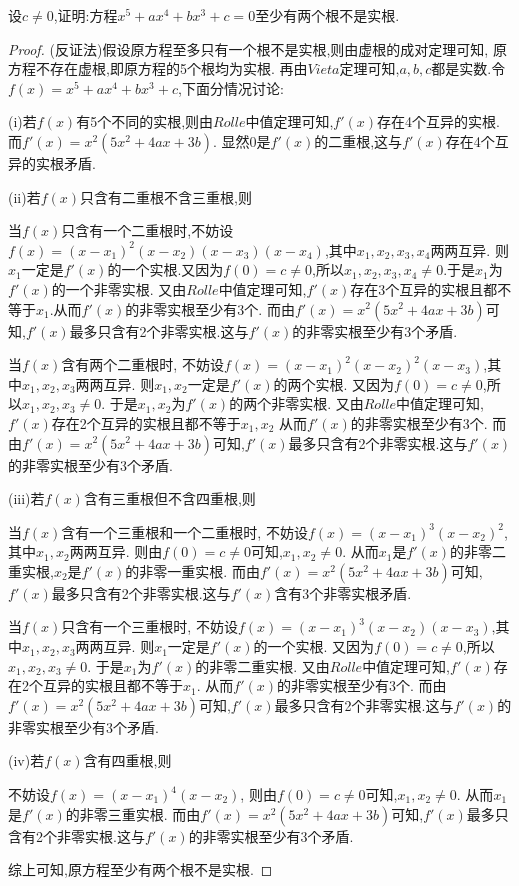 \documentclass[lang=cn,newtx,10pt,scheme=chinese]{../Template/elegantbook}
\begin{document}
\begin{exercise}
    设\(c\neq0\),证明:方程\(x^5 + ax^4 + bx^3 + c = 0\)至少有两个根不是实根.
\end{exercise}
    \begin{proof}
        (反证法)假设原方程至多只有一个根不是实根,则由虚根的成对定理可知,
        原方程不存在虚根,即原方程的5个根均为实根.
        再由$Vieta$定理可知,$a,b,c$都是实数.令$f(x)=x^5+ax^4+bx^3+c$,下面分情况讨论:

        (i)若$f(x)$有5个不同的实根,则由$Rolle$中值定理可知,$f'(x)$存在4个互异的实根.
        而$f'(x) =x^2(5x^2+4ax+3b)$.
        显然0是$f'(x)$的二重根,这与$f'(x)$存在4个互异的实根矛盾.

        (ii)若$f(x)$只含有二重根不含三重根,则

        当$f(x)$只含有一个二重根时,不妨设$f(x)=(x-x_1)^2(x-x_2)(x-x_3)(x-x_4)$,其中$x_1,x_2,x_3,x_4$两两互异.
        则$x_1$一定是$f'(x)$的一个实根.又因为$f(0)=c\ne0$,所以$x_1,x_2,x_3,x_4\ne0$.于是$x_1$为$f'(x)$的一个非零实根.
        又由$Rolle$中值定理可知,$f'(x)$存在3个互异的实根且都不等于$x_1$.从而$f'(x)$的非零实根至少有3个.
        而由$f'(x) =x^2(5x^2+4ax+3b)$可知,$f'(x)$最多只含有2个非零实根.这与$f'(x)$的非零实根至少有3个矛盾.

        当$f(x)$含有两个二重根时,
        不妨设$f(x)=(x-x_1)^2(x-x_2)^2(x-x_3)$,其中$x_1,x_2,x_3$两两互异.
        则$x_1,x_2$一定是$f'(x)$的两个实根.
        又因为$f(0)=c\ne0$,所以$x_1,x_2,x_3\ne0$.
        于是$x_1,x_2$为$f'(x)$的两个非零实根.
        又由$Rolle$中值定理可知,$f'(x)$存在2个互异的实根且都不等于$x_1,x_2$
        从而$f'(x)$的非零实根至少有3个.
        而由$f'(x) =x^2(5x^2+4ax+3b)$可知,$f'(x)$最多只含有2个非零实根.这与$f'(x)$的非零实根至少有3个矛盾.

        (iii)若$f(x)$含有三重根但不含四重根,则

        当$f(x)$含有一个三重根和一个二重根时,
        不妨设$f(x)=(x-x_1)^3(x-x_2)^2$,其中$x_1,x_2$两两互异.
        则由$f(0)=c\ne0$可知,$x_1,x_2\ne0$.
        从而$x_1$是$f'(x)$的非零二重实根,$x_2$是$f'(x)$的非零一重实根.
        而由$f'(x) =x^2(5x^2+4ax+3b)$可知,$f'(x)$最多只含有2个非零实根.这与$f'(x)$含有3个非零实根矛盾.
        
        当$f(x)$只含有一个三重根时,
        不妨设$f(x)=(x-x_1)^3(x-x_2)(x-x_3)$,其中$x_1,x_2,x_3$两两互异.
        则$x_1$一定是$f'(x)$的一个实根.
        又因为$f(0)=c\ne0$,所以$x_1,x_2,x_3\ne0$.
        于是$x_1$为$f'(x)$的非零二重实根.
        又由$Rolle$中值定理可知,$f'(x)$存在2个互异的实根且都不等于$x_1$.
        从而$f'(x)$的非零实根至少有3个.
        而由$f'(x) =x^2(5x^2+4ax+3b)$可知,$f'(x)$最多只含有2个非零实根.这与$f'(x)$的非零实根至少有3个矛盾.

        (iv)若$f(x)$含有四重根,则

        不妨设$f(x)=(x-x_1)^4(x-x_2)$,
        则由$f(0)=c\ne0$可知,$x_1,x_2\ne0$.
        从而$x_1$是$f'(x)$的非零三重实根.
        而由$f'(x) =x^2(5x^2+4ax+3b)$可知,$f'(x)$最多只含有2个非零实根.这与$f'(x)$的非零实根至少有3个矛盾.

        综上可知,原方程至少有两个根不是实根.
    \end{proof}
\end{document}
